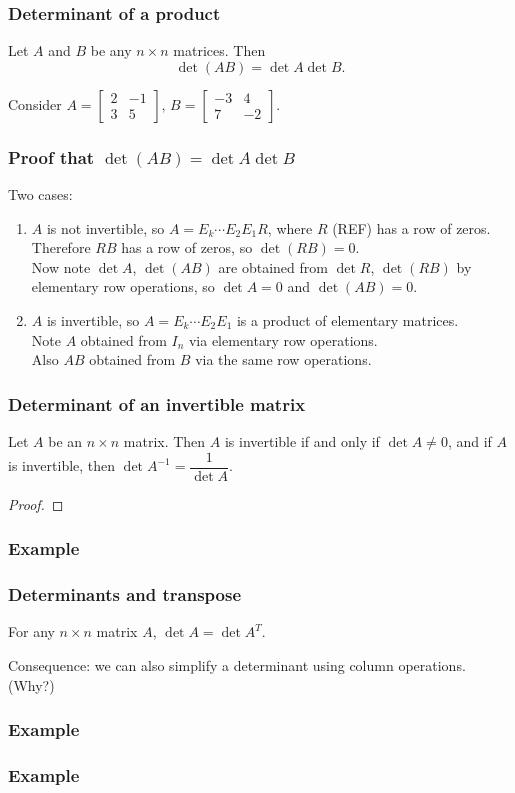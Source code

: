 \documentclass[11pt,t]{beamer}
\begin{document}
\begin{frame}
\frametitle{Determinant of a product}
\begin{theorem}
Let $A$ and $B$ be any $n\times n$ matrices. Then
\[
\det (AB) = \det A \det B.
\]
\end{theorem}
\begin{example}
Consider $A = \begin{bmatrix}2&-1\\3&5\end{bmatrix},\, B = \begin{bmatrix}-3&4\\7&-2\end{bmatrix}$.


\end{example}
\end{frame}
\begin{frame}
\frametitle{Proof that $\det (AB)=\det A\det B$}
Two cases:
\begin{enumerate}
\item $A$ is not invertible, so $A=E_k\cdots E_2E_1R$, where $R$ (REF) has a row of zeros.\\
 Therefore $RB$ has a row of zeros, so $\det (RB)=0$. \\
 Now note $\det A$, $\det (AB)$ are obtained from $\det R$, $\det (RB)$ by elementary row operations, so $\det A=0$ and $\det (AB) = 0$.
\item $A$ is invertible, so $A=E_k\cdots E_2E_1$ is a product of elementary matrices.\\
Note $A$ obtained from $I_n$ via elementary row operations.\\
Also $AB$ obtained from $B$ via the \alert{same} row operations.
\end{enumerate}
\end{frame}
\begin{frame}
\frametitle{Determinant of an invertible matrix}
\begin{theorem}
Let $A$ be an $n\times n$ matrix. Then $A$ is invertible if and only if $\det A\neq 0$, and if $A$ is invertible, then $\det A^{-1} = \dfrac{1}{\det A}$.
\end{theorem}
\begin{proof}
\vspace{1.7in}
\end{proof}
\end{frame}
\begin{frame}
\frametitle{Example}

\end{frame}
\begin{frame}
\frametitle{Determinants and transpose}
\begin{theorem}
For any $n\times n$ matrix $A$, $\det A = \det A^T$.
\end{theorem}
\alert{Consequence}: we can also simplify a determinant using column operations. (Why?)
\end{frame}
\begin{frame}
\frametitle{Example}

\end{frame}
\begin{frame}
\frametitle{Example}

\end{frame}
\end{document}
